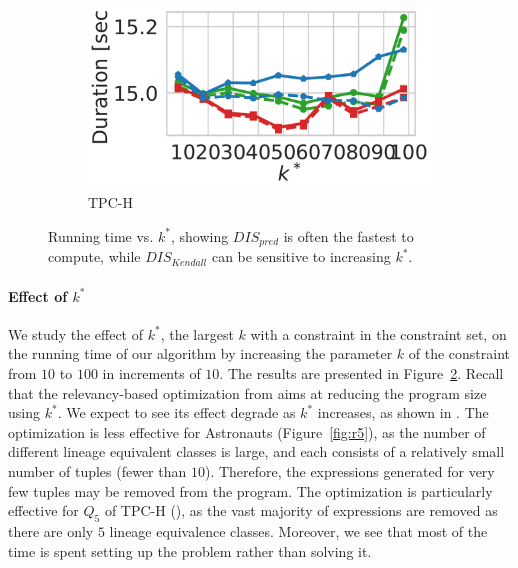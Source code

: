 \begin{figure}[t]
\begin{subfigure}{.35\textwidth}
    \end{subfigure}
    \begin{subfigure}{.35\textwidth}
      \centering
      \includegraphics[width=.75\linewidth]{figures/tpch_k.pdf}
      \caption{TPC-H}
      \label{fig:r8}
    \end{subfigure}

    \caption{Running time vs. $k^*$, showing $DIS_{pred}$ is often the fastest to compute, while $DIS_{Kendall}$ can be sensitive to increasing $k^*$.}
    \label{fig:time_vs_k}
\end{figure}
\paragraph*{\textbf{Effect of $k^*$}}
We study the effect of $k^*$, the largest $k$ with a constraint in the constraint set, on the running time of our algorithm by increasing the parameter $k$ of the constraint from $10$ to $100$ in increments of $10$. The results are presented in Figure~\ref{fig:time_vs_k}. Recall that the relevancy-based optimization from  aims at reducing the program size using $k^*$. 
We expect to see its effect degrade as $k^*$ increases, as shown in . 
The optimization is less effective for  Astronauts (Figure~\ref{fig:r5}), as the number of different lineage equivalent classes is large, and each consists of a relatively small number of tuples (fewer than $10$). 
Therefore, the expressions generated for very few tuples may be removed from the program. The optimization is particularly effective for $Q_5$ of TPC-H (), as the vast majority of expressions are removed as there are only $5$ lineage equivalence classes. Moreover, we see that most of the time is spent setting up the problem rather than solving it.


